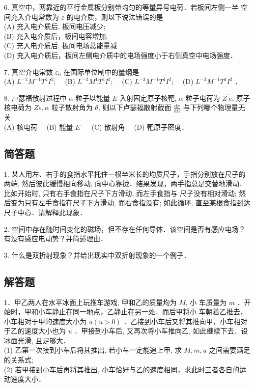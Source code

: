 6. 真空中，两靠近的平行金属板分别带均匀的等量异号电荷．若板间左侧一半 空间充入介电常数为 $\varepsilon$ 的电介质，则以下说法错误的是 \\
(A) 充入电介质后, 板间电压减少;\\
(B) 充入电介质后，板间电容增加;\\
(C) 充入电介质后, 板间电场总能量减\\
(D) 充入电介质后，板间左侧电介质中的电场强度小于右侧真空中电场强度．

7. 真空介电常数 $\varepsilon_{0}$ 在国际单位制中的量纲是\\
(A) $L^{-2} M^{-1} T^{4} I^{2}$;$\quad$
(B) $L^{-2} M^{1} T^{3} I^{2}$;$\quad$
(C) $L^{-3} M^{-1} T^{4} I^{2}$;$\quad$
(D) $L^{-3} M^{-1} T^{3} I^{2}$ ．

8. 卢瑟福散射过程中 $\alpha$ 粒子以能量 $E$ 入射固定原子核靶, $\alpha$ 粒子电荷为 $Z^{\prime} e$, 原子核电荷为 $Z e, \alpha$ 粒子散射角为 $\theta$, 则以下卢瑟福散射截面 $\frac{\mathrm{d} \sigma}{\mathrm{d} \Omega}$ 与下列哪个物理量无关\\
(A) 核电荷$\quad$
(B) 能量 $E$ $\quad$
(C) 散射角$\quad$
(D) 靶原子密度．
\subsection{简答题}
1.  某人用左、右手的食指水平托住一根半米长的均质尺子，手指分别放在尺子的两端, 然后彼此缓慢相向移动, 向中心靠拢．结果发现，两手指总是交替地滑动．比如开始时, 只有右手食指在尺子下方滑动, 而左手食指与 尺子没有相对滑动; 然后变为只有左手食指在尺子下方滑动, 而右食指没有; 如此循环, 直至某根食指到达尺子中心．请解释此现象．

2. 空间中存在随时间变化的磁场，但不存在任何导体．该空间是否有感应电场？有没有感应电动势？并简述理由．

3. 什么是双折射现象？并给出现实中双折射现象的一个例子．
\subsection{解答题}
1．甲乙两人在水平冰面上玩推车游戏, 甲和乙的质量均为 $M$, 小 车质量为 $m$ ．开始时，甲和小车静止在同一地点，乙静止在另一处．而后甲将小 车朝着乙推去，小车相对于甲的速度大小为 $u(u>0)$ ．乙接到小车后又将其推向甲，小车相对于乙的速度大小也为 $u$ ．甲接到小车后, 又再次将小车推向乙, 如此继续下去．设冰面光滑, 且足够大．\\
(1) 乙第一次接到小车后将其推出, 若小车一定能追上甲, 求 $M, m, u$ 之间需要满足的关系式;\\
(2) 若甲接到小车后再将其推出, 小车恰好与乙的速度相同，求此时三者各自的运动速度大小．


